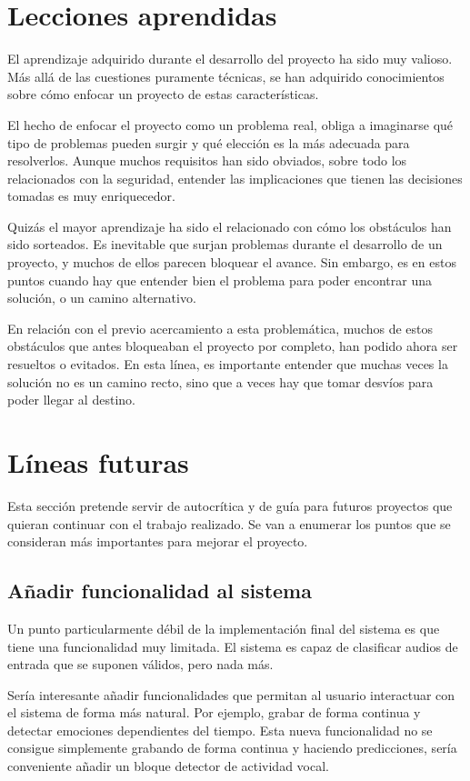 \section{Lecciones aprendidas}
El aprendizaje adquirido durante el desarrollo del proyecto ha sido muy valioso.
Más allá de las cuestiones puramente técnicas, se han adquirido conocimientos sobre cómo enfocar un proyecto de estas características.

El hecho de enfocar el proyecto como un problema real, obliga a imaginarse qué tipo de problemas pueden surgir y qué elección es la más adecuada para resolverlos.
Aunque muchos requisitos han sido obviados, sobre todo los relacionados con la seguridad, entender las implicaciones que tienen las decisiones tomadas es muy enriquecedor.

Quizás el mayor aprendizaje ha sido el relacionado con cómo los obstáculos han sido sorteados.
Es inevitable que surjan problemas durante el desarrollo de un proyecto, y muchos de ellos parecen bloquear el avance.
Sin embargo, es en estos puntos cuando hay que entender bien el problema para poder encontrar una solución, o un camino alternativo.

En relación con el previo acercamiento a esta problemática, muchos de estos obstáculos que antes bloqueaban el proyecto por completo, han podido ahora ser resueltos o evitados.
En esta línea, es importante entender que muchas veces la solución no es un camino recto, sino que a veces hay que tomar desvíos para poder llegar al destino.


\section{Líneas futuras}

Esta sección pretende servir de autocrítica y de guía para futuros proyectos que quieran continuar con el trabajo realizado.
Se van a enumerar los puntos que se consideran más importantes para mejorar el proyecto.

\subsection{Añadir funcionalidad al sistema}
Un punto particularmente débil de la implementación final del sistema es que tiene una funcionalidad muy limitada.
El sistema es capaz de clasificar audios de entrada que se suponen válidos, pero nada más.

Sería interesante añadir funcionalidades que permitan al usuario interactuar con el sistema de forma más natural.
Por ejemplo, grabar de forma continua y detectar emociones dependientes del tiempo.
Esta nueva funcionalidad no se consigue simplemente grabando de forma continua y haciendo predicciones, sería conveniente añadir un bloque detector de actividad vocal.

